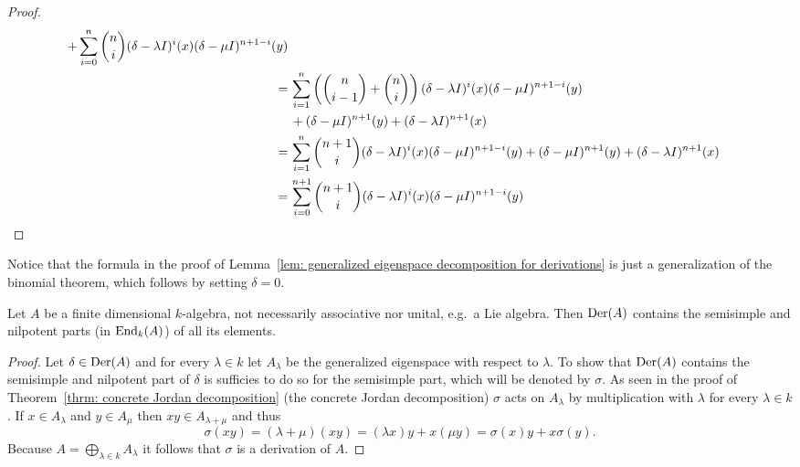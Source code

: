 \begin{proof}
\begin{align*}
       +\sum_{i=0}^n \binom{n}{i} (\delta-\lambda I)^i(x) (\delta-\mu I)^{n+1-i}(y) \\
  =&\,  \sum_{i=1}^n \left(\binom{n}{i-1}+\binom{n}{i}\right) (\delta-\lambda I)^i(x) (\delta-\mu I)^{n+1-i}(y) \\
   &\, +(\delta-\mu I)^{n+1}(y) + (\delta-\lambda I)^{n+1}(x) \\
  =&\,  \sum_{i=1}^n \binom{n+1}{i} (\delta-\lambda I)^i(x) (\delta-\mu I)^{n+1-i}(y)
       +(\delta-\mu I)^{n+1}(y) + (\delta-\lambda I)^{n+1}(x) \\
  =&\, \sum_{i=0}^{n+1} \binom{n+1}{i} (\delta-\lambda I)^i(x) (\delta-\mu I)^{n+1-i}(y)
 \qedhere
 \end{align*}
 \endgroup
\end{proof}


\begin{remark}
 Notice that the formula in the proof of Lemma~\ref{lem: generalized eigenspace decomposition for derivations} is just a generalization of the binomial theorem, which follows by setting $\delta = 0$.
\end{remark}


\begin{lemma}\label{lem: derivations contain the ss and np part of all its elements}
 Let $A$ be a finite dimensional $k$-algebra, not necessarily associative nor unital, e.g.\ a Lie algebra. Then $\operatorname{Der}(A)$ contains the semisimple and nilpotent parts (in $\operatorname{End}_k(A)$) of all its elements.
\end{lemma}
\begin{proof}
 Let $\delta \in \operatorname{Der}(A)$ and for every $\lambda \in k$ let $A_\lambda$ be the generalized eigenspace with respect to $\lambda$. To show that $\operatorname{Der}(A)$ contains the semisimple and nilpotent part of $\delta$ is sufficies to do so for the semisimple part, which will be denoted by $\sigma$. As seen in the proof of Theorem~\ref{thrm: concrete Jordan decomposition} (the concrete Jordan decomposition) $\sigma$ acts on $A_\lambda$ by multiplication with $\lambda$ for every $\lambda \in k$. If $x \in A_\lambda$ and $y \in A_\mu$ then $xy \in A_{\lambda + \mu}$ and thus
 \[
  \sigma(xy)
  = (\lambda + \mu)(xy)
  = (\lambda x)y + x(\mu y)
  = \sigma(x)y + x\sigma(y).
 \]
 Because $A = \bigoplus_{\lambda \in k} A_\lambda$ it follows that $\sigma$ is a derivation of $A$.
\end{proof}


